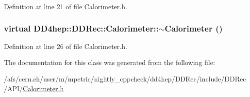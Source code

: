 Definition at line 21 of file Calorimeter.h.\hypertarget{class_d_d4hep_1_1_d_d_rec_1_1_calorimeter_a173a06cc2634725e660a04fa65b36c09}{
\subsubsection[{$\sim$Calorimeter}]{\setlength{\rightskip}{0pt plus 5cm}virtual DD4hep::DDRec::Calorimeter::$\sim$Calorimeter ()}}
\label{class_d_d4hep_1_1_d_d_rec_1_1_calorimeter_a173a06cc2634725e660a04fa65b36c09}


Definition at line 26 of file Calorimeter.h.

The documentation for this class was generated from the following file:\begin{DoxyCompactItemize}
\item 
/afs/cern.ch/user/m/mpetric/nightly\_\-cppcheck/dd4hep/DDRec/include/DDRec/API/\hyperlink{_calorimeter_8h}{Calorimeter.h}\end{DoxyCompactItemize}
